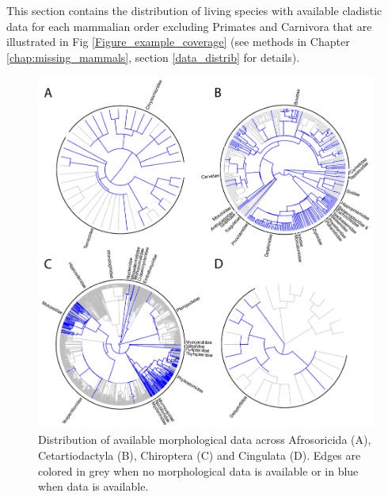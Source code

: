 This section contains the distribution of living species with available cladistic data for each mammalian order excluding Primates and Carnivora that are illustrated in Fig \ref{Figure_example_coverage} (see methods in Chapter \ref{chap:missing_mammals}, section \ref{data_distrib} for details).

\begin{figure}[!ht]
\centering
    \includegraphics[width=\textwidth]{Supplementaries/Figures/MissingMammals/Combined_phy1.pdf}
\caption[Available data in Afrosoricida, Cetartiodactyla, Chiroptera and Dasyuromorphia]{Distribution of available morphological data across Afrosoricida (A), Cetartiodactyla (B), Chiroptera (C) and Cingulata (D). Edges are colored in grey when no morphological data is available or in blue when data is available.}
\label{Supp_combined_phy1}
\end{figure}

